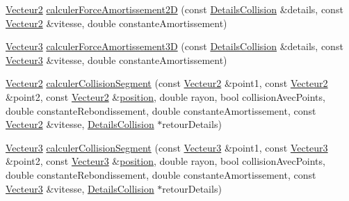 \begin{DoxyCompactItemize}
\hyperlink{group__utilitaire_ga6f7808e68c967b90bd7e737b7e1b78de}{Vecteur2} \hyperlink{namespaceaidecollision_ab12dd816a00b79e23993bc1e27fd7859}{calculer\-Force\-Amortissement2\-D} (const \hyperlink{classaidecollision_1_1_details_collision}{Details\-Collision} \&details, const \hyperlink{group__utilitaire_ga6f7808e68c967b90bd7e737b7e1b78de}{Vecteur2} \&vitesse, double constante\-Amortissement)
\item 
\hyperlink{group__utilitaire_ga541aa4837ad9250d3a248dc82ee9ad4d}{Vecteur3} \hyperlink{namespaceaidecollision_a2d14adb05414527ee23e93d54f656277}{calculer\-Force\-Amortissement3\-D} (const \hyperlink{classaidecollision_1_1_details_collision}{Details\-Collision} \&details, const \hyperlink{group__utilitaire_ga541aa4837ad9250d3a248dc82ee9ad4d}{Vecteur3} \&vitesse, double constante\-Amortissement)
\item 
\hyperlink{group__utilitaire_ga6f7808e68c967b90bd7e737b7e1b78de}{Vecteur2} \hyperlink{namespaceaidecollision_a85a0be1f19e12cd25413002996b24bb1}{calculer\-Collision\-Segment} (const \hyperlink{group__utilitaire_ga6f7808e68c967b90bd7e737b7e1b78de}{Vecteur2} \&point1, const \hyperlink{group__utilitaire_ga6f7808e68c967b90bd7e737b7e1b78de}{Vecteur2} \&point2, const \hyperlink{group__utilitaire_ga6f7808e68c967b90bd7e737b7e1b78de}{Vecteur2} \&\hyperlink{fmod__codec_8h_a7d71cf36b6a2fc185ecbc89f93fa58a3}{position}, double rayon, bool collision\-Avec\-Points, double constante\-Rebondissement, double constante\-Amortissement, const \hyperlink{group__utilitaire_ga6f7808e68c967b90bd7e737b7e1b78de}{Vecteur2} \&vitesse, \hyperlink{classaidecollision_1_1_details_collision}{Details\-Collision} $\ast$retour\-Details)
\item 
\hyperlink{group__utilitaire_ga541aa4837ad9250d3a248dc82ee9ad4d}{Vecteur3} \hyperlink{namespaceaidecollision_a7b4ab7ec2265e5a0c9d85f80b0243cb9}{calculer\-Collision\-Segment} (const \hyperlink{group__utilitaire_ga541aa4837ad9250d3a248dc82ee9ad4d}{Vecteur3} \&point1, const \hyperlink{group__utilitaire_ga541aa4837ad9250d3a248dc82ee9ad4d}{Vecteur3} \&point2, const \hyperlink{group__utilitaire_ga541aa4837ad9250d3a248dc82ee9ad4d}{Vecteur3} \&\hyperlink{fmod__codec_8h_a7d71cf36b6a2fc185ecbc89f93fa58a3}{position}, double rayon, bool collision\-Avec\-Points, double constante\-Rebondissement, double constante\-Amortissement, const \hyperlink{group__utilitaire_ga541aa4837ad9250d3a248dc82ee9ad4d}{Vecteur3} \&vitesse, \hyperlink{classaidecollision_1_1_details_collision}{Details\-Collision} $\ast$retour\-Details)
\item 

\end{DoxyCompactItemize}
